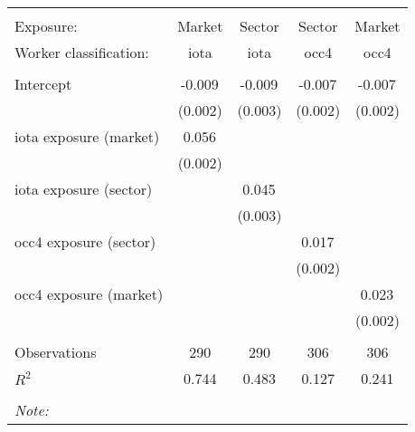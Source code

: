 \begin{tabular}{@{\extracolsep{5pt}}lcccc}
\\[-1.8ex]\hline
\hline \\[-1.8ex]
\hline \\[-1.8ex]
 Exposure: & Market & Sector & Sector & Market \\
 Worker classification: & iota & iota & occ4 & occ4 \\
 \hline &  &  &  &  \\
 Intercept & -0.009$^{}$ & -0.009$^{}$ & -0.007$^{}$ & -0.007$^{}$ \\
  & (0.002) & (0.003) & (0.002) & (0.002) \\
 iota exposure (market) & 0.056$^{}$ & & & \\
  & (0.002) & & & \\
 iota exposure (sector) & & 0.045$^{}$ & & \\
  & & (0.003) & & \\
 occ4 exposure (sector) & & & 0.017$^{}$ & \\
  & & & (0.002) & \\
 occ4 exposure (market) & & & & 0.023$^{}$ \\
  & & & & (0.002) \\
\hline \\[-1.8ex]
 Observations & 290 & 290 & 306 & 306 \\
 $R^2$ & 0.744 & 0.483 & 0.127 & 0.241 \\
\hline
\hline \\[-1.8ex]
\textit{Note:}\end{tabular}